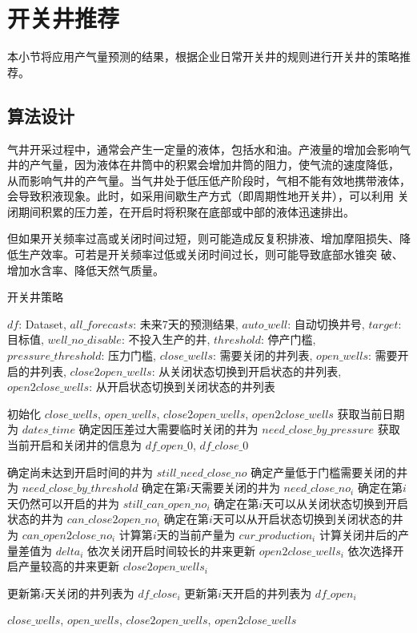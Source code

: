 \section{开关井推荐}
本小节将应用产气量预测的结果，根据企业日常开关井的规则进行开关井的策略推荐。
\subsection{算法设计}
气井开采过程中，通常会产生一定量的液体，包括水和油。产液量的增加会影响气井的产气量，因为液体在井筒中的积累会增加井筒的阻力，使气流的速度降低，
从而影响气井的产气量。当气井处于低压低产阶段时，气相不能有效地携带液体，会导致积液现象。此时，如采用间歇生产方式（即周期性地开关井），可以利用
关闭期间积累的压力差，在开启时将积聚在底部或中部的液体迅速排出。

但如果开关频率过高或关闭时间过短，则可能造成反复积排液、增加摩阻损失、降低生产效率。可若是开关频率过低或关闭时间过长，则可能导致底部水锥突
破、增加水含率、降低天然气质量。
\begin{algorithm}[H]
    \baselineskip=20pt
    \caption{开关井策略}
    \label{al:openclose}
    \begin{algorithmic}[1]
    \Require $df$: Dataset, $all\_forecasts$: 未来7天的预测结果, $auto\_well$: 自动切换井号, $target$: 目标值, $well\_no\_disable$: 不投入生产的井, $threshold$: 停产门槛, $pressure\_threshold$: 压力门槛,
    \Ensure $close\_wells$: 需要关闭的井列表, $open\_wells$: 需要开启的井列表, $close2open\_wells$: 从关闭状态切换到开启状态的井列表, $open2close\_wells$: 从开启状态切换到关闭状态的井列表
    
    \State 初始化 $close\_wells$, $open\_wells$, $close2open\_wells$, $open2close\_wells$
    \State 获取当前日期为 $dates\_time$
    \State 确定因压差过大需要临时关闭的井为 $need\_close\_by\_pressure$
    \State 获取当前开启和关闭井的信息为 $df\_open\_0$, $df\_close\_0$
    
        \State 确定尚未达到开启时间的井为 $still\_need\_close\_no$
        \State 确定产量低于门槛需要关闭的井为 $need\_close\_by\_threshold$
        \State 确定在第$i$天需要关闭的井为 $need\_close\_no_i$ 
        \State 确定在第$i$天仍然可以开启的井为 $still\_can\_open\_no_i$ 
        \State 确定在第$i$天可以从关闭状态切换到开启状态的井为 $can\_close2open\_no_i$ 
        \State 确定在第$i$天可以从开启状态切换到关闭状态的井为 $can\_open2close\_no_i$ 
        \State 计算第$i$天的当前产量为 $cur\_production_i$
        \State 计算关闭井后的产量差值为 $delta_i$ 
            \State 依次关闭开启时间较长的井来更新 $open2close\_wells_i$
        \Else
            \State 依次选择开启产量较高的井来更新 $close2open\_wells_i$
        \EndIf
        
        \State 更新第$i$天关闭的井列表为 $df\_close_i$
        \State 更新第$i$天开启的井列表为 $df\_open_i$
    \EndFor
    
    \State \Return $close\_wells$, $open\_wells$, $close2open\_wells$, $open2close\_wells$
    
    \end{algorithmic}
  \end{algorithm}


